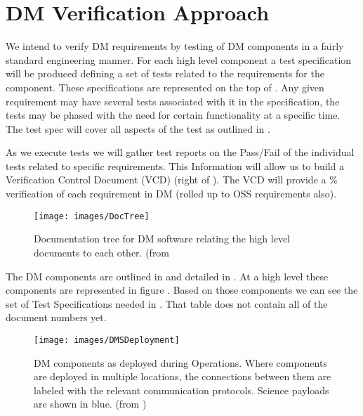 \section{DM Verification Approach \label{approach}}

We intend to verify DM requirements by testing of DM components in a fairly standard engineering manner.
For each high level component a test specification will be produced defining a set of tests related to the requirements for the component. 
These specifications are represented on the top of .
Any given  requirement may have several tests associated with it in the specification, the tests may be phased with the need for certain functionality at a specific time. 
The test spec will cover all aspects of the test as outlined in . 

As we execute tests we will gather test reports on the Pass/Fail of the individual tests related to specific requirements.
This Information will allow us to build a Verification Control Document (VCD) (right of ).
The VCD will provide a \% verification of each requirement in DM (rolled up to OSS requirements also).



\begin{figure}
\begin{center}
 \texttt{[image: images/DocTree]}
 \caption{Documentation tree for DM software relating the high level documents to each other. (from \label{fig:doctree}}

 \end{center}
 \end{figure}



 The DM components are  outlined in  and detailed in . At a high level these components are represented in figure .  Based on those components we can see the set of Test Specifications needed in . That table does not contain all of the document numbers yet. 


\begin{figure}[htbp]
	\begin{center}
		\texttt{[image: images/DMSDeployment]}
		\caption{DM components as deployed during Operations. Where components are
			deployed in multiple locations, the connections between them are labeled with
			the relevant communication protocols. Science payloads are shown in blue.
		\label{fig:dmsdeploy} (from )}
	\end{center}
\end{figure}

